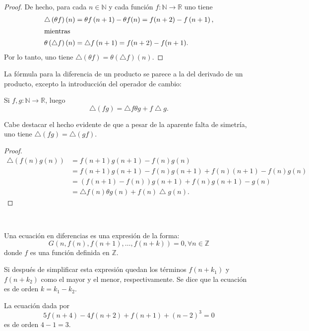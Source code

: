 \begin{proof}
De hecho, para cada $n\in\mathds{N} $ y cada función $f\colon\mathds{N}\rightarrow\mathds{R}$ uno tiene
	\begin{align*}
		\bigtriangleup\left(\theta f\right)(n)&=\theta f\left(n+1\right)-\theta f(n)=f(n+2)-f\left(n+1\right),\\
		\shortintertext{mientras}
		\theta\left(\bigtriangleup f\right)(n)&=\bigtriangleup f\left(n+1\right)=f(n+2)-f(n+1).
	\end{align*}
Por lo tanto, uno tiene $\bigtriangleup\left(\theta f\right)=\theta\left(\bigtriangleup f\right)(n)$.
\end{proof}
La fórmula para la diferencia de un producto se parece a la del derivado de un producto, excepto la introducción del operador de cambio:
\begin{proposition}
Si $f,g\colon\mathds{N}\rightarrow\mathds{R}$, luego \[ \bigtriangleup\left(fg\right)=\bigtriangleup f\theta g+f\bigtriangleup g. \]
\end{proposition}

\begin{remark}
	Cabe destacar el hecho evidente de que a pesar de la aparente falta de simetría, uno tiene $\bigtriangleup\left(fg\right)=\bigtriangleup\left(gf\right)$.
\end{remark}

\begin{proof}
	\begin{align*}
		\bigtriangleup\left(f(n)g(n)\right)
		&=f\left(n+1\right)g\left(n+1\right)-f(n)g(n)\\
		&=f(n+1)g(n+1)-f(n)g(n+1)+f(n)(n+1)-f(n)g(n)\\
		&=(f(n+1)-f(n))g(n+1)+f(n)g(n+1)-g(n)\\
		&=\bigtriangleup f(n)\theta g(n)+f(n)\bigtriangleup g(n).
	\end{align*}
\end{proof}

\

Una ecuación en diferencias es una expresión de la forma: \[ G\left(n,f(n),f(n+1),\ldots,f(n+k)\right)=0,\forall n\in\mathds{Z} \] donde $f$ es una función definida en $\mathds{Z}$.

Si después de simplificar esta expresión quedan los términos $f\left(n+k_{1}\right)$ y $f\left(n+k_{2}\right)$ como el mayor y el menor, respectivamente. Se dice que la ecuación es de orden $k=k_{1}-k_{2}$.

\begin{example}
	La ecuación dada por \[ 5f(n+4)-4f(n+2)+f(n+1)+(n-2)^{3}=0 \] es de orden $4-1=3$.
\end{example}

